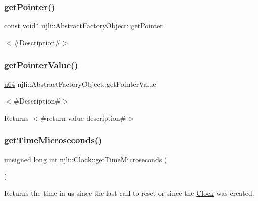 \subsubsection{\texorpdfstring{get\+Pointer()}{getPointer()}}
{\footnotesize\ttfamily const \mbox{\hyperlink{_thread_8h_af1e856da2e658414cb2456cb6f7ebc66}{void}}$\ast$ njli\+::\+Abstract\+Factory\+Object\+::get\+Pointer}

$<$\#\+Description\#$>$ \mbox{\label{classnjli_1_1_clock_a4ffddf141a426a5a07d0ac19f1913811}} 
\subsubsection{\texorpdfstring{get\+Pointer\+Value()}{getPointerValue()}}
{\footnotesize\ttfamily \mbox{\hyperlink{_util_8h_ad758b7a5c3f18ed79d2fcd23d9f16357}{u64}} njli\+::\+Abstract\+Factory\+Object\+::get\+Pointer\+Value}

$<$\#\+Description\#$>$

\begin{DoxyReturn}{Returns}
$<$\#return value description\#$>$ 
\end{DoxyReturn}
\mbox{\label{classnjli_1_1_clock_ac1debc5f875f6011e082d93037127870}} 
\subsubsection{\texorpdfstring{get\+Time\+Microseconds()}{getTimeMicroseconds()}}
{\footnotesize\ttfamily unsigned long int njli\+::\+Clock\+::get\+Time\+Microseconds (\begin{DoxyParamCaption}{ }\end{DoxyParamCaption})}

Returns the time in us since the last call to reset or since the \mbox{\hyperlink{classnjli_1_1_clock}{Clock}} was created. \mbox{\label{classnjli_1_1_clock_af5585917dc19bff0dd795e7a86bb0bef}} 
